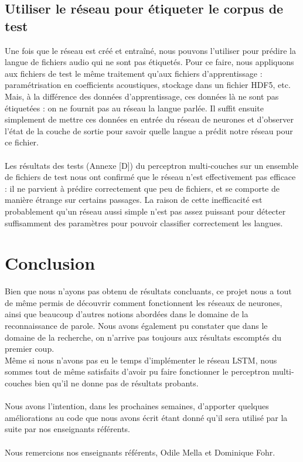 \documentclass{article}
\begin{document}
\subsection{Utiliser le réseau pour étiqueter le corpus de test}

Une fois que le réseau est créé et entraîné, nous pouvons l'utiliser pour prédire la langue de fichiers audio qui ne sont pas étiquetés. Pour ce faire, nous appliquons aux fichiers de test le même traitement qu'aux fichiers d'apprentissage : paramétrisation en coefficients acoustiques, stockage dans un fichier HDF5, etc. Mais, à la différence des données d'apprentissage, ces données là ne sont pas étiquetées : on ne fournit pas au réseau la langue parlée. Il suffit ensuite simplement de mettre ces données en entrée du réseau de neurones et d'observer l'état de la couche de sortie pour savoir quelle langue a prédit notre réseau pour ce fichier.\\
 \\
Les résultats des tests (Annexe [D]) du perceptron multi-couches sur un ensemble de fichiers de test nous ont confirmé que le réseau n'est effectivement pas efficace : il ne parvient à prédire correctement que peu de fichiers, et se comporte de manière étrange sur certains passages. La raison de cette inefficacité est probablement qu'un réseau aussi simple n'est pas assez puissant pour détecter suffisamment des paramètres pour pouvoir classifier correctement les langues.\\
\newpage
\section{Conclusion}

Bien que nous n'ayons pas obtenu de résultats concluants, ce projet nous a tout de même permis de découvrir comment fonctionnent les réseaux de neurones, ainsi que beaucoup d'autres notions abordées dans le domaine de la reconnaissance de parole. Nous avons également pu constater que dans le domaine de la recherche, on n'arrive pas toujours aux résultats escomptés du premier coup.\\
Même si nous n'avons pas eu le temps d'implémenter le réseau LSTM, nous sommes tout de même satisfaits d'avoir pu faire fonctionner le perceptron multi-couches bien qu'il ne donne pas de résultats probants.\\
 \\
Nous avons l'intention, dans les prochaines semaines, d'apporter quelques améliorations au code que nous avons écrit étant donné qu'il sera utilisé par la suite par nos enseignants référents.\\
 \\
Nous remercions nos enseignants référents, Odile Mella et Dominique Fohr. 
\end{document}
